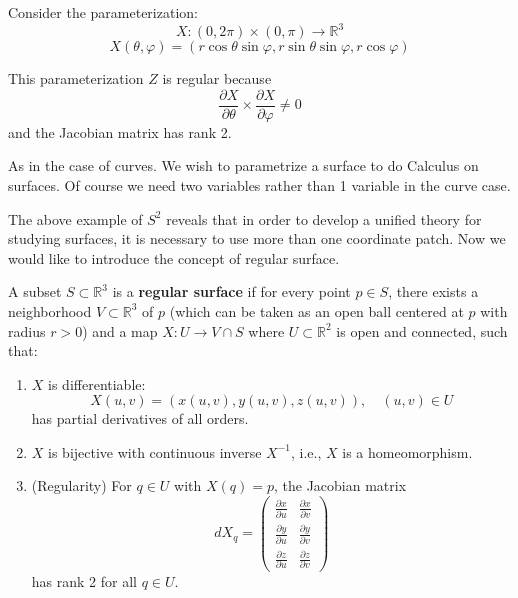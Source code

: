 \documentclass{article}
\begin{document}
\begin{example}
    Consider the parameterization:
\[
X: (0,2\pi) \times (0,\pi) \rightarrow \mathbb{R}^3
\]
\[
X(\theta, \varphi) = (r\cos\theta\sin\varphi, r\sin\theta\sin\varphi, r\cos\varphi)
\]


This parameterization $Z$ is regular because
\[
\frac{\partial X}{\partial \theta} \times \frac{\partial X}{\partial \varphi} \neq 0
\]
and the Jacobian matrix has rank 2.

\end{example}
As in the case of curves. We wish to parametrize a surface to do Calculus on surfaces. Of course we need two variables rather than 1 variable in the curve case.
\begin{remark}
The above example of ${S}^2$ reveals that in order to develop a unified theory for studying surfaces, it is necessary to use more than one coordinate patch. Now we would like to introduce the concept of regular surface.  
\end{remark}
\begin{definition}
A subset $S \subset \mathbb{R}^3$ is a \textbf{regular surface} if for every point $p \in S$, there exists a neighborhood $V \subset \mathbb{R}^3$ of $p$ (which can be taken as an open ball centered at $p$ with radius $r > 0$) and a map $X: U \rightarrow V \cap S$ where $U \subset \mathbb{R}^2$ is open and connected, such that:

\begin{enumerate}
    \item $X$ is differentiable: 
    \[
    X(u,v) = (x(u,v), y(u,v), z(u,v)), \quad (u,v) \in U
    \]
    has partial derivatives of all orders.
    
    \item $X$ is bijective with continuous inverse $X^{-1}$, i.e., $X$ is a homeomorphism.
    
    \item (Regularity) For $q \in U$ with $X(q) = p$, the Jacobian matrix
    \[
    dX_q = \begin{pmatrix}
    \frac{\partial x}{\partial u} & \frac{\partial x}{\partial v} \\
    \frac{\partial y}{\partial u} & \frac{\partial y}{\partial v} \\
    \frac{\partial z}{\partial u} & \frac{\partial z}{\partial v}
    \end{pmatrix}
    \]
    has rank 2 for all $q \in U$.
\end{enumerate}
\end{definition}
\end{document}
